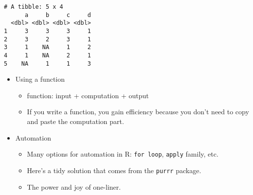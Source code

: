 \documentclass[
  letterpaper,
  DIV=11,
  numbers=noendperiod]{scrreprt}
\newenvironment{Shaded}{\begin{snugshade}}{\end{snugshade}}
\newcommand{\CommentTok}[1]{\textcolor[rgb]{0.37,0.37,0.37}{#1}}
\newcommand{\ConstantTok}[1]{\textcolor[rgb]{0.56,0.35,0.01}{#1}}
\newcommand{\ControlFlowTok}[1]{\textcolor[rgb]{0.00,0.23,0.31}{#1}}
\newcommand{\DecValTok}[1]{\textcolor[rgb]{0.68,0.00,0.00}{#1}}
\newcommand{\FunctionTok}[1]{\textcolor[rgb]{0.28,0.35,0.67}{#1}}
\newcommand{\NormalTok}[1]{\textcolor[rgb]{0.00,0.23,0.31}{#1}}
\newcommand{\OtherTok}[1]{\textcolor[rgb]{0.00,0.23,0.31}{#1}}
\newcommand{\SpecialCharTok}[1]{\textcolor[rgb]{0.37,0.37,0.37}{#1}}
\providecommand{\tightlist}{%
  \setlength{\itemsep}{0pt}\setlength{\parskip}{0pt}}\usepackage{longtable,booktabs,array}
\begin{document}
\begin{verbatim}
# A tibble: 5 x 4
      a     b     c     d
  <dbl> <dbl> <dbl> <dbl>
1     3     3     3     1
2     3     2     3     1
3     1    NA     1     2
4     1    NA     2     1
5    NA     1     1     3
\end{verbatim}

\begin{itemize}
\tightlist
\item
  Using a function

  \begin{itemize}
  \tightlist
  \item
    function: input + computation + output
  \item
    If you write a function, you gain efficiency because you don't need
    to copy and paste the computation part.
  \end{itemize}
\end{itemize}

\begin{Shaded}
\end{Shaded}

\begin{itemize}
\tightlist
\item
  Automation

  \begin{itemize}
  \tightlist
  \item
    Many options for automation in R: \texttt{for\ loop}, \texttt{apply}
    family, etc.
  \item
    Here's a tidy solution that comes from the \texttt{purrr} package.
  \item
    The power and joy of one-liner.
  \end{itemize}
\end{itemize}
\end{document}
